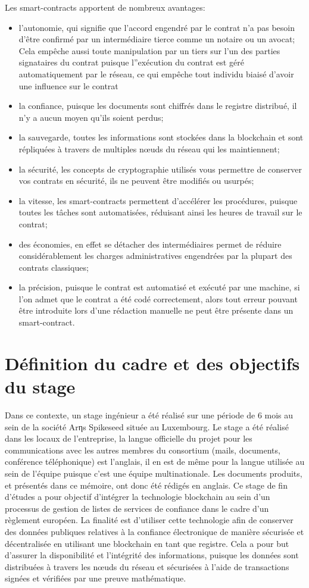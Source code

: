 \documentclass{tnreport}
\begin{document}
Les smart-contracts apportent de nombreux avantages:
\begin{itemize}
	\item l'autonomie, qui signifie que l'accord engendré par le contrat n'a pas besoin d'être confirmé par un intermédiaire tierce comme un notaire ou un avocat; Cela empêche aussi toute manipulation par un tiers sur l'un des parties signataires du contrat puisque l''exécution du contrat est géré automatiquement par le réseau, ce qui empêche tout individu biaisé d'avoir une influence sur le contrat
	\item la confiance, puisque les documents sont chiffrés dans le registre distribué, il n'y a aucun moyen qu'ils soient perdus;
	\item la sauvegarde, toutes les informations sont stockées dans la blockchain et sont répliquées à travers de multiples nœuds du réseau qui les maintiennent;
	\item la sécurité, les concepts de cryptographie utilisés vous permettre de conserver vos contrats en sécurité, ils ne peuvent être modifiés ou usurpés;
	\item la vitesse, les smart-contracts permettent d'accélérer les procédures, puisque toutes les tâches sont automatisées, réduisant ainsi les heures de travail sur le contrat;
	\item des économies, en effet se détacher des intermédiaires permet de réduire considérablement les charges administratives engendrées par la plupart des contrats classiques;
	\item la précision, puisque le contrat est automatisé et exécuté par une machine, si l'on admet que le contrat a été codé correctement, alors tout erreur pouvant être introduite lors d'une rédaction manuelle ne peut être présente dans un smart-contract.
\end{itemize}

\section{Définition du cadre et des objectifs du stage}

Dans ce contexte, un stage ingénieur a été réalisé sur une période de 6 mois au sein de la société Arηs Spikeseed située au Luxembourg. 
Le stage a été réalisé dans les locaux de l'entreprise, la langue officielle du projet pour les communications avec les autres membres du consortium (mails, documents, conférence téléphonique) est l’anglais, il en est de même pour la langue utilisée au sein de l'équipe puisque c'est une équipe multinationale. Les documents produits, et présentés dans ce mémoire, ont donc été rédigés en anglais.
Ce stage de fin d'études a pour objectif d'intégrer la technologie blockchain au sein d'un processus de gestion de listes de services de confiance dans le cadre d'un règlement européen. 
La finalité est d'utiliser cette technologie afin de conserver des données publiques relatives à la confiance électronique de manière sécurisée et décentralisée en utilisant une blockchain en tant que registre.
Cela a pour but d'assurer la disponibilité et l'intégrité des informations, puisque les données sont distribuées à travers les nœuds du réseau et sécurisées à l'aide de transactions signées et vérifiées par une preuve mathématique. 
\end{document}
